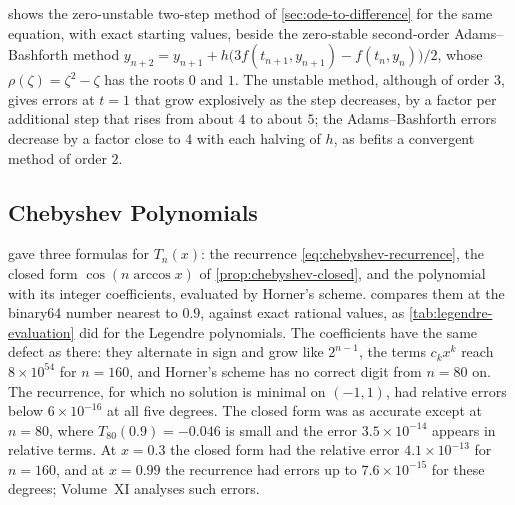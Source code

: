  shows the zero-unstable two-step method of \cref{sec:ode-to-difference} for the same equation, with exact starting values, beside the zero-stable second-order Adams--Bashforth method $y_{n+2}=y_{n+1}+h\bigl(3f(t_{n+1},y_{n+1})-f(t_n,y_n)\bigr)/2$, whose $\rho(\zeta)=\zeta^2-\zeta$ has the roots $0$ and $1$. The unstable method, although of order $3$, gives errors at $t=1$ that grow explosively as the step decreases, by a factor per additional step that rises from about $4$ to about $5$; the Adams--Bashforth errors decrease by a factor close to $4$ with each halving of $h$, as befits a convergent method of order $2$.

\begin{table}
\end{table}

\subsection{Chebyshev Polynomials}

 gave three formulas for $T_n(x)$: the recurrence \eqref{eq:chebyshev-recurrence}, the closed form $\cos(n\arccos x)$ of \cref{prop:chebyshev-closed}, and the polynomial with its integer coefficients, evaluated by Horner's scheme.  compares them at the binary64 number nearest to $0.9$, against exact rational values, as \cref{tab:legendre-evaluation} did for the Legendre polynomials. The coefficients have the same defect as there: they alternate in sign and grow like $2^{n-1}$, the terms $c_kx^k$ reach $8\times10^{54}$ for $n=160$, and Horner's scheme has no correct digit from $n=80$ on. The recurrence, for which no solution is minimal on $(-1,1)$, had relative errors below $6\times10^{-16}$ at all five degrees. The closed form was as accurate except at $n=80$, where $T_{80}(0.9)=-0.046$ is small and the error $3.5\times10^{-14}$ appears in relative terms. At $x=0.3$ the closed form had the relative error $4.1\times10^{-13}$ for $n=160$, and at $x=0.99$ the recurrence had errors up to $7.6\times10^{-15}$ for these degrees; Volume~XI analyses such errors.

